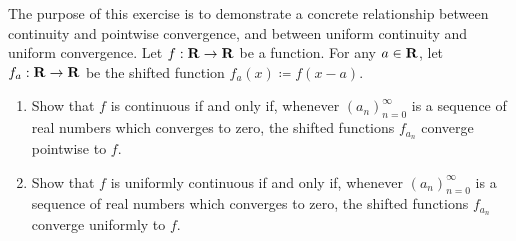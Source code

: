 \exercisesection

\begin{exercise}\label{ex 3.2.1}
    The purpose of this exercise is to demonstrate a concrete relationship between continuity and pointwise convergence, and between uniform continuity and uniform convergence.
    Let \(f : \mathbf{R} \to \mathbf{R}\) be a function.
    For any \(a \in \mathbf{R}\), let \(f_a : \mathbf{R} \to \mathbf{R}\) be the shifted function \(f_a(x) \coloneqq f(x - a)\).
    \begin{enumerate}
        \item Show that \(f\) is continuous if and only if, whenever \((a_n)_{n = 0}^\infty\) is a sequence of real numbers which converges to zero, the shifted functions \(f_{a_n}\) converge pointwise to \(f\).
        \item Show that \(f\) is uniformly continuous if and only if, whenever \((a_n)_{n = 0}^\infty\) is a sequence of real numbers which converges to zero, the shifted functions \(f_{a_n}\) converge uniformly to \(f\).
    \end{enumerate}
\end{exercise}

